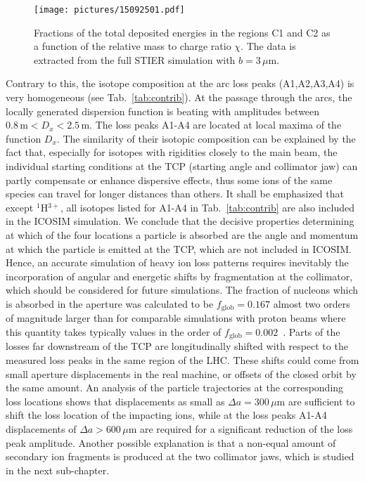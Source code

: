 \begin{figure}[t]
\centering
 \texttt{[image: pictures/15092501.pdf]}

\caption{Fractions of the total deposited energies in the regions C1 and C2 as a function of the relative mass to charge ratio $\chi$. The data is extracted from the full STIER simulation with $b=3\,\mu$m.}
\label{fig:15032102}
\end{figure}

Contrary to this, the isotope composition at the arc loss peaks (A1,A2,A3,A4) is very homogeneous (see Tab.~\ref{tab:contrib}). At the passage through the arcs, the locally generated dispersion function is beating with amplitudes between $0.8\,\text{m} < D_x < 2.5\,\text{m}$. The loss peaks A1-A4 are located at local maxima of the function $D_x$. The similarity of their isotopic composition can be explained by the fact that, especially for isotopes with rigidities closely to the main beam, the individual starting conditions at the TCP (starting angle and collimator jaw) can partly compensate or enhance dispersive effects, thus some ions of the same species can travel for longer distances than others. It shall be emphasized that except $^1$H$^{3+}$, all isotopes listed for A1-A4 in Tab.~\ref{tab:contrib} are also included in the ICOSIM simulation. We conclude that the decisive properties determining at which of the four locations a particle is absorbed are the angle and momentum at which the particle is emitted at the TCP, which are not included in ICOSIM. Hence, an accurate simulation of heavy ion loss patterns requires inevitably the incorporation of angular and energetic shifts by fragmentation at the collimator, which should be considered for future simulations.
%
The fraction of nucleons which is absorbed in the aperture was calculated to be $f_\text{glob}=0.167$ almost two orders of magnitude larger than for comparable simulations with proton beams where this quantity takes typically values in the order of $f_\text{glob}=0.002$~\cite{Bruce2014a}.
%
Parts of the losses far downstream of the TCP are longitudinally shifted with respect to the measured loss peaks in the same region of the LHC. These shifts could come from small aperture displacements in the real machine, or offsets of the closed orbit by the same amount. An analysis of the particle trajectories at the corresponding loss locations shows that displacements as small as $\Delta a =300\,\mu$m are sufficient to shift the loss location of the impacting ions, while at the loss peaks A1-A4 displacements of $\Delta a > 600\,\mu$m are required for a significant reduction of the loss peak amplitude. Another possible explanation is that a non-equal amount of secondary ion fragments is produced at the two collimator jaws, which is studied in the next sub-chapter.






